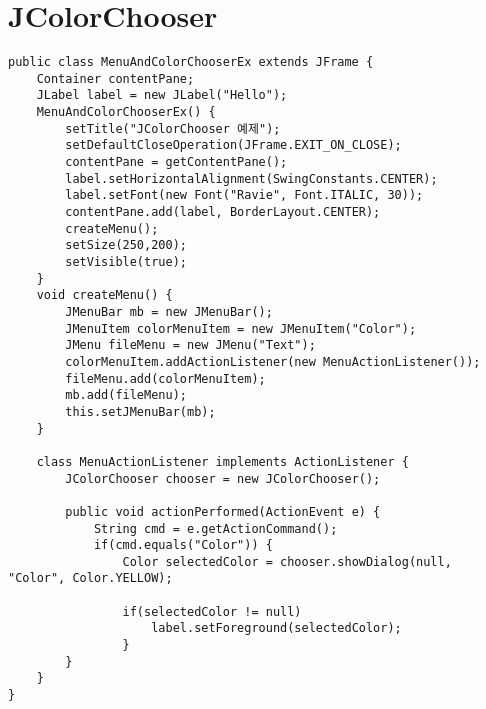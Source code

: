\section{JColorChooser}
\begin{verbatim}
public class MenuAndColorChooserEx extends JFrame {
    Container contentPane;
    JLabel label = new JLabel("Hello");
    MenuAndColorChooserEx() {
        setTitle("JColorChooser 예제");
        setDefaultCloseOperation(JFrame.EXIT_ON_CLOSE);
        contentPane = getContentPane();
        label.setHorizontalAlignment(SwingConstants.CENTER);
        label.setFont(new Font("Ravie", Font.ITALIC, 30));
        contentPane.add(label, BorderLayout.CENTER);
        createMenu();
        setSize(250,200);
        setVisible(true);
    }
    void createMenu() {
        JMenuBar mb = new JMenuBar();
        JMenuItem colorMenuItem = new JMenuItem("Color");
        JMenu fileMenu = new JMenu("Text");
        colorMenuItem.addActionListener(new MenuActionListener());
        fileMenu.add(colorMenuItem);
        mb.add(fileMenu);
        this.setJMenuBar(mb);
    }

    class MenuActionListener implements ActionListener {
        JColorChooser chooser = new JColorChooser();

        public void actionPerformed(ActionEvent e) {
            String cmd = e.getActionCommand();
            if(cmd.equals("Color")) {
                Color selectedColor = chooser.showDialog(null, "Color", Color.YELLOW);
            
                if(selectedColor != null)
                    label.setForeground(selectedColor);
                }
        }
    }
}
\end{verbatim}


